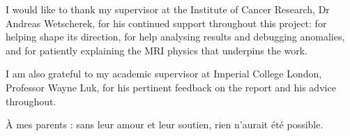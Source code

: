 I would like to thank my supervisor at the Institute of Cancer Research, Dr
Andreas Wetscherek, for his continued support throughout this project: for
helping shape its direction, for help analysing results and debugging
anomalies, and for patiently explaining the MRI physics that underpins the work.

I am also grateful to my academic supervisor at Imperial College London,
Professor Wayne Luk, for his pertinent feedback on the report and his advice
throughout.

À mes parents : sans leur amour et leur soutien, rien n'aurait été possible.
